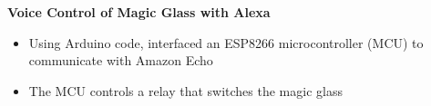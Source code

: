 \documentclass[letterpaper,11pt]{article}
\newcommand{\resumeItem}[2]{
  \item\small{
    \textbf{#1}{: #2 \vspace{-3pt}}
  }
}
\newcommand{\resumeSubItem}[2]{\resumeItem{#1}{#2}\vspace{-3.5pt}}
\begin{document}
    \textbf{Voice Control of Magic Glass with Alexa} 
    \vspace{-4pt}
        \begin{itemize}
            \item Using Arduino code, interfaced an ESP8266 microcontroller (MCU) to communicate with Amazon Echo
            \vspace{-5pt}
            \item The MCU controls a relay that switches the magic glass
        \end{itemize}
        
    \begin{comment}

    \small \textbf{Document Scanner} 
    \vspace{-4pt}
        \begin{itemize}
            \item Used perspective transform in Python and OpenCV to obtain a top-down view of a piece of document
        \end{itemize}
    \vspace{-2pt}
    
    \small \textbf{Color Based Object Tracking} 
    \vspace{-4pt}
        \begin{itemize}
            \item Using HSV thresholding, tracked a ball
            \vspace{-5pt}
            \item More than 30 fps
        \end{itemize}
    \vspace{-2pt}
    
    \resumeSubItem{Handwritten Digit Recognition}
      {Using HOG (Histogram of Oriented Gradients), SVM (Support Vector Machine), and OpenCV. On [placeholder] dataset, achieved [placeholder] accuracy}
      
    \resumeSubItem{Data Center Temperature Monitoring}
      {Python warning script for rising temperatures in data centres}
      
    \end{comment}

        


    

\end{document}
